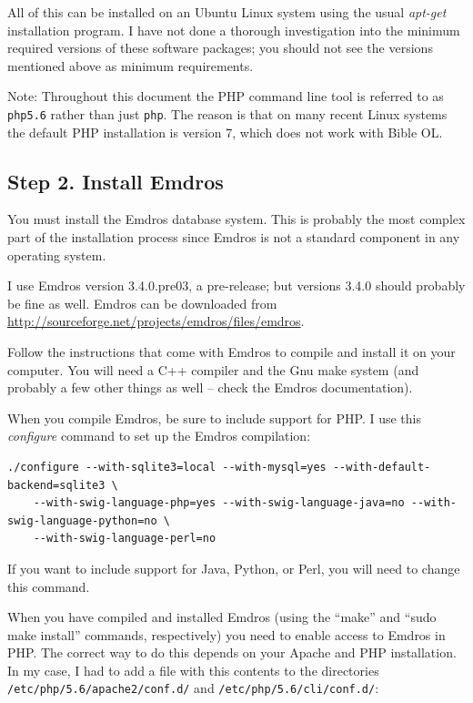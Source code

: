 \documentclass[11pt,oneside,a4paper]{memoir}
\begin{document}
All of this can be installed on an Ubuntu Linux system using the usual \emph{apt-get} installation
program. I have not done a thorough investigation into the minimum required versions of these
software packages; you should not see the versions mentioned above as minimum requirements.

Note: Throughout this document the PHP command line tool is referred to as \texttt{php5.6}
rather than just \texttt{php}. The reason is that on many recent Linux systems the default PHP
installation is version 7, which does not work with Bible OL.


\subsection{Step 2. Install Emdros}\label{sec-install-emdros}

You must install the Emdros database system. This is probably the most complex part of
the installation process since Emdros is not a standard component in any operating system.

I use Emdros version 3.4.0.pre03, a pre-release; but versions 3.4.0 should probably be fine as well.
Emdros can be downloaded from \url{http://sourceforge.net/projects/emdros/files/emdros}.

Follow the instructions that come with Emdros to compile and install it on your computer. You will
need a C++ compiler and the Gnu make%
system (and probably a few other things as well -- check the Emdros documentation).

When you compile Emdros, be sure to include support for PHP. I use this
\emph{configure} command to set up the Emdros compilation:

\begin{lstlisting}
./configure --with-sqlite3=local --with-mysql=yes --with-default-backend=sqlite3 \
    --with-swig-language-php=yes --with-swig-language-java=no --with-swig-language-python=no \
    --with-swig-language-perl=no
\end{lstlisting}

If you want to include support for Java, Python, or Perl, you
will need to change this command.

When you have compiled and installed Emdros (using the ``make'' and ``sudo make install'' commands,
respectively) you need to enable access to Emdros in PHP. The correct way to do this depends on your
Apache\index{Apache} and PHP installation. In my case, I had to add a file with this contents to the
directories \texttt{/etc/php/5.6/apache2/conf.d/} and \texttt{/etc/php/5.6/cli/conf.d/}:
\end{document}
